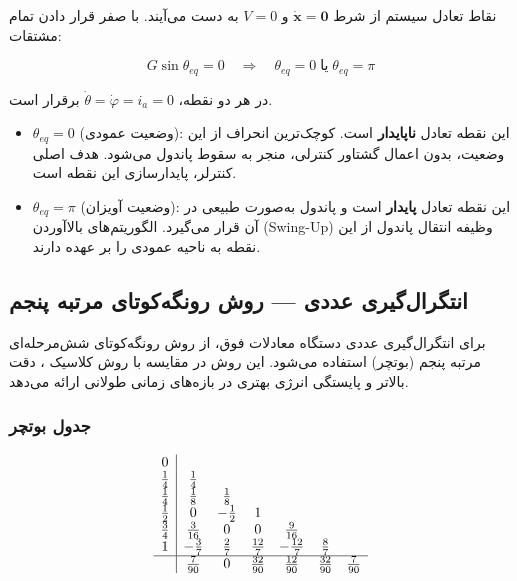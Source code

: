 نقاط تعادل سیستم از شرط $\dot{\mathbf{x}} = \mathbf{0}$ و $V = 0$ به دست می‌آیند. با صفر قرار دادن تمام مشتقات:

\begin{equation}
    G \sin\theta_{eq} = 0 \quad \Longrightarrow \quad \theta_{eq} = 0 \;\text{یا}\; \theta_{eq} = \pi
\end{equation}

در هر دو نقطه، $\dot{\theta} = \dot{\varphi} = i_a = 0$ برقرار است.

\begin{itemize}
    \item $\theta_{eq} = 0$ (وضعیت عمودی): این نقطه تعادل \textbf{ناپایدار} است. کوچک‌ترین انحراف از این وضعیت، بدون اعمال گشتاور کنترلی، منجر به سقوط پاندول می‌شود. هدف اصلی کنترلر، پایدارسازی این نقطه است.
    \item $\theta_{eq} = \pi$ (وضعیت آویزان): این نقطه تعادل \textbf{پایدار} است و پاندول به‌صورت طبیعی در آن قرار می‌گیرد. الگوریتم‌های بالاآوردن (Swing-Up) وظیفه انتقال پاندول از این نقطه به ناحیه عمودی را بر عهده دارند.
\end{itemize}

\subsection{انتگرال‌گیری عددی — روش رونگه‌کوتای مرتبه پنجم}

برای انتگرال‌گیری عددی دستگاه معادلات فوق، از روش رونگه‌کوتای شش‌مرحله‌ای مرتبه پنجم (بوتچر) استفاده می‌شود. این روش در مقایسه با روش کلاسیک ، دقت بالاتر و پایستگی انرژی بهتری در بازه‌های زمانی طولانی ارائه می‌دهد.

\subsubsection{جدول بوتچر}

\begin{equation}
    \begin{array}{c|cccccc}
    0 & & & & & & \\
    \frac{1}{4} & \frac{1}{4} & & & & & \\
    \frac{1}{4} & \frac{1}{8} & \frac{1}{8} & & & & \\
    \frac{1}{2} & 0 & -\frac{1}{2} & 1 & & & \\
    \frac{3}{4} & \frac{3}{16} & 0 & 0 & \frac{9}{16} & & \\
    1 & -\frac{3}{7} & \frac{2}{7} & \frac{12}{7} & -\frac{12}{7} & \frac{8}{7} & \\
    \hline
    & \frac{7}{90} & 0 & \frac{32}{90} & \frac{12}{90} & \frac{32}{90} & \frac{7}{90}
    \end{array}
\end{equation}

